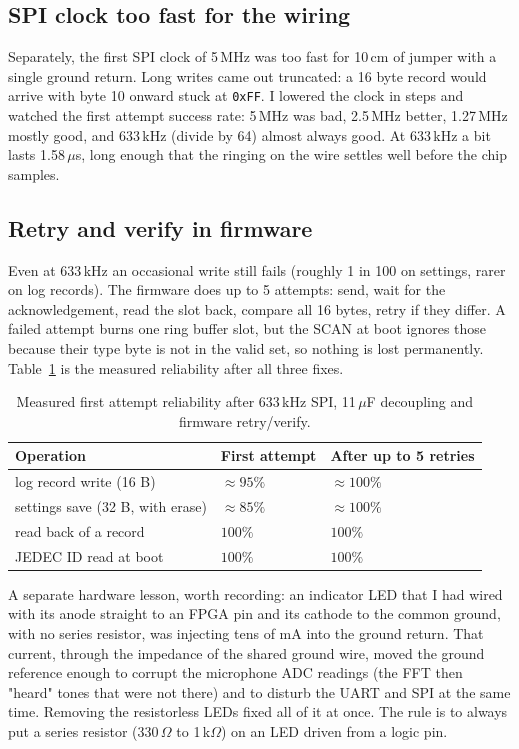 \documentclass[a4paper,11pt]{article}
\begin{document}
\subsection{SPI clock too fast for the wiring}

Separately, the first SPI clock of 5\,MHz was too fast for 10\,cm of jumper with a
single ground return. Long writes came out truncated: a 16 byte record would arrive
with byte 10 onward stuck at \texttt{0xFF}. I lowered the clock in steps and watched
the first attempt success rate: 5\,MHz was bad, 2.5\,MHz better, 1.27\,MHz mostly
good, and 633\,kHz (divide by 64) almost always good. At 633\,kHz a bit lasts
1.58\,$\mu$s, long enough that the ringing on the wire settles well before the chip
samples.

\subsection{Retry and verify in firmware}

Even at 633\,kHz an occasional write still fails (roughly 1 in 100 on settings,
rarer on log records). The firmware does up to 5 attempts: send, wait for the
acknowledgement, read the slot back, compare all 16 bytes, retry if they differ. A
failed attempt burns one ring buffer slot, but the SCAN at boot ignores those
because their type byte is not in the valid set, so nothing is lost permanently.
Table~\ref{tab:bench} is the measured reliability after all three fixes.

\begin{table}[H]
\centering
\caption{Measured first attempt reliability after 633\,kHz SPI, 11\,$\mu$F
decoupling and firmware retry/verify.}
\label{tab:bench}
\begin{tabular}{lll}
\toprule
\textbf{Operation} & \textbf{First attempt} & \textbf{After up to 5 retries} \\
\midrule
log record write (16 B)              & $\approx 95\%$ & $\approx 100\%$ \\
settings save (32 B, with erase)     & $\approx 85\%$ & $\approx 100\%$ \\
read back of a record                & $100\%$        & $100\%$ \\
JEDEC ID read at boot                & $100\%$        & $100\%$ \\
\bottomrule
\end{tabular}
\end{table}

A separate hardware lesson, worth recording: an indicator LED that I had wired with
its anode straight to an FPGA pin and its cathode to the common ground, with no
series resistor, was injecting tens of mA into the ground return. That current,
through the impedance of the shared ground wire, moved the ground reference enough
to corrupt the microphone ADC readings (the FFT then "heard" tones that were not
there) and to disturb the UART and SPI at the same time. Removing the resistorless
LEDs fixed all of it at once. The rule is to always put a series resistor (330\,$\Omega$
to 1\,k$\Omega$) on an LED driven from a logic pin.
\end{document}
